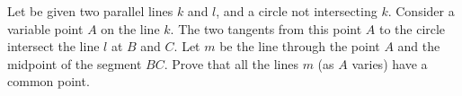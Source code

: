 Let be given two parallel lines $k$ and $l$, and a circle not intersecting $k$. Consider a variable point $A$ on the line $k$. The two tangents from this point $A$ to the circle intersect the line $l$ at $B$ and $C$. Let $m$ be the line through the point $A$ and the midpoint of the segment $BC$. Prove that all the lines $m$ (as $A$ varies) have a common point.